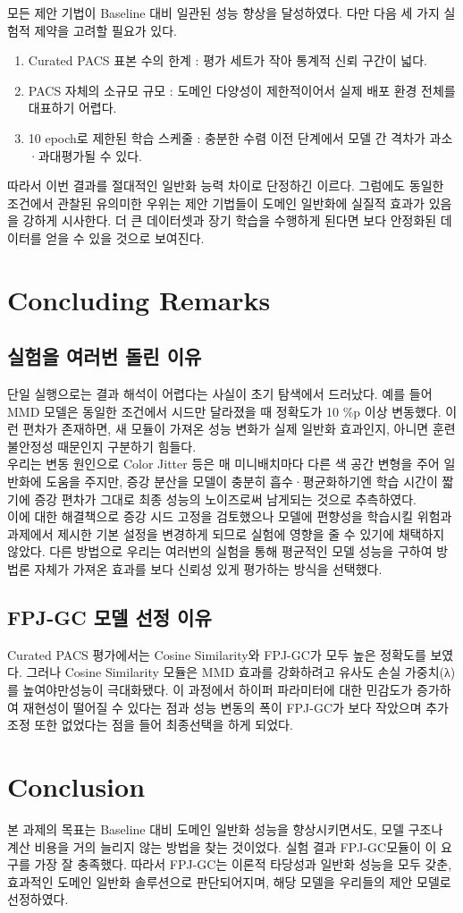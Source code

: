 모든 제안 기법이 Baseline 대비 일관된 성능 향상을 달성하였다. 다만 다음 세 가지 실험적 제약을 고려할 필요가 있다.

\begin{enumerate}
  \item Curated PACS 표본 수의 한계 : 평가 세트가 작아 통계적 신뢰 구간이 넓다.
  \item PACS 자체의 소규모 규모 : 도메인 다양성이 제한적이어서 실제 배포 환경 전체를 대표하기 어렵다.
  \item 10 epoch로 제한된 학습 스케줄 : 충분한 수렴 이전 단계에서 모델 간 격차가 과소·과대평가될 수 있다.
\end{enumerate}

따라서 이번 결과를 절대적인 일반화 능력 차이로 단정하긴 이르다. 그럼에도 동일한 조건에서 관찰된 유의미한 우위는 
제안 기법들이 도메인 일반화에 실질적 효과가 있음을 강하게 시사한다. 더 큰 데이터셋과 장기 학습을 수행하게 된다면 
보다 안정화된 데이터를 얻을 수 있을 것으로 보여진다.


\section{Concluding Remarks}
\subsection{실험을 여러번 돌린 이유}
단일 실행으로는 결과 해석이 어렵다는 사실이 초기 탐색에서 드러났다.
예를 들어 MMD 모델은 동일한 조건에서 시드만 달라졌을 때 정확도가 10 \%p 이상 변동했다. 
이런 편차가 존재하면, 새 모듈이 가져온 성능 변화가 실제 일반화 효과인지, 아니면 훈련 
불안정성 때문인지 구분하기 힘들다.\\
우리는 변동 원인으로 Color Jitter 등은 매 미니배치마다 다른 색 공간 변형을 주어 
일반화에 도움을 주지만, 증강 분산을 모델이 충분히 흡수·평균화하기엔 학습 시간이 짧기에 
증강 편차가 그대로 최종 성능의 노이즈로써 남게되는 것으로 추측하였다.\\
이에 대한 해결책으로 증강 시드 고정을 검토했으나 모델에 편향성을 학습시킬 위험과 과제에서 제시한 
기본 설정을 변경하게 되므로 실험에 영향을 줄 수 있기에 채택하지 않았다. 다른 방법으로 
우리는 여러번의 실험을 통해 평균적인 모델 성능을 구하여 방법론 자체가 가져온 효과를 보다 
신뢰성 있게 평가하는 방식을 선택했다.

\subsection{FPJ-GC 모델 선정 이유}
Curated PACS 평가에서는 Cosine Similarity와 FPJ-GC가 모두 높은 정확도를 보였다. 
그러나 Cosine Similarity 모듈은 MMD 효과를 강화하려고 유사도 손실 가중치(λ)를 높여야만성능이 극대화됐다. 
이 과정에서 하이퍼 파라미터에 대한 민감도가 증가하여 재현성이 떨어질 수 있다는 점과 성능 변동의 폭이 
FPJ-GC가 보다 작았으며 추가조정 또한 없었다는 점을 들어 최종선택을 하게 되었다.

\section{Conclusion}
본 과제의 목표는 Baseline 대비 도메인 일반화 성능을 향상시키면서도, 모델 구조나 계산 비용을 거의 늘리지 
않는 방법을 찾는 것이었다. 실험 결과 FPJ-GC모듈이 이 요구를 가장 잘 충족했다. 따라서 FPJ-GC는 이론적 타당성과 일반화 
성능을 모두 갖춘, 효과적인 도메인 일반화 솔루션으로 판단되어지며, 해당 모델을 우리들의 제안 모델로 선정하였다.

